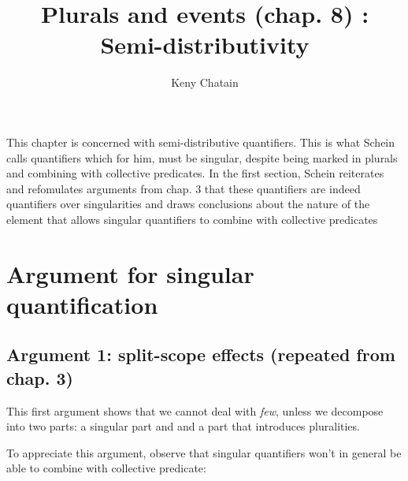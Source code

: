 





\endofdump

\newcommand{\scale}{1}

\title{Plurals and events (chap. 8) : Semi-distributivity}
\author{Keny Chatain}


\maketitle

This chapter is concerned with semi-distributive quantifiers. This is what Schein calls quantifiers which for him, must be singular, despite being marked in plurals and combining with collective predicates. In the first section, Schein reiterates and refomulates arguments from chap. 3 that these quantifiers are indeed quantifiers over singularities and draws conclusions about the nature of the element that allows singular quantifiers to combine with collective predicates

\section{Argument for singular quantification}
\subsection{Argument 1: split-scope effects (repeated from chap. 3)}

This first argument shows that we cannot deal with \emph{few}, unless we decompose into two parts: a singular part and and a part that introduces pluralities.

To appreciate this argument, observe that singular quantifiers won't in general be able to combine with collective predicate:

